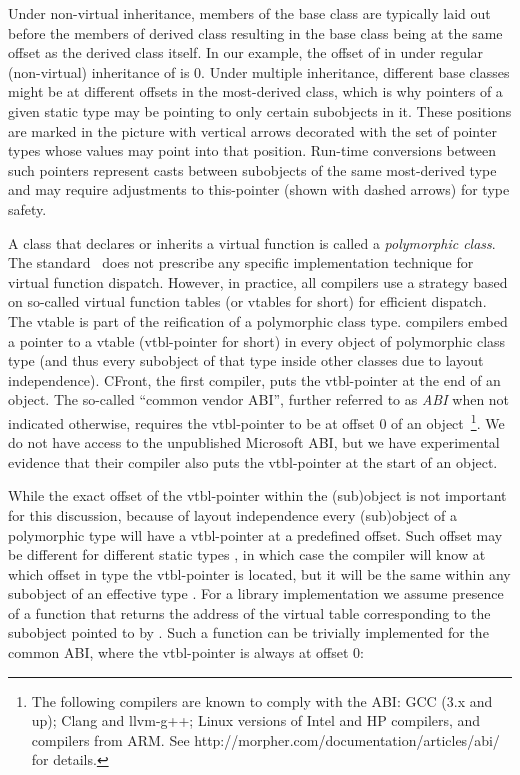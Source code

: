Under non-virtual inheritance, members of the base class are typically laid out 
before the members of derived class resulting in the base class being at the 
same offset as the derived class itself. In our example, the offset of  
in  under regular (non-virtual) inheritance of  is 0.
Under multiple inheritance, different base classes might be at different offsets 
in the most-derived class, which is why pointers of a given static type may be 
pointing to only certain subobjects in it. These positions are marked in the 
picture with vertical arrows decorated with the set of pointer types whose 
values may point into that position. Run-time conversions between such pointers 
represent casts between subobjects of the same most-derived type and may require 
adjustments to this-pointer (shown with dashed arrows) for type safety.

A class that declares or inherits a virtual function is called a 
\emph{polymorphic class}. The \Cpp{} standard~\cite{C++11} does not prescribe any 
specific implementation technique for virtual function dispatch.
However, in practice, all \Cpp{} compilers use a strategy based on so-called
virtual function tables (or vtables for short) for efficient dispatch. 
The vtable is part of the reification of a polymorphic class type.  
\Cpp{} compilers embed a pointer to a vtable (vtbl-pointer for short) in every object of
polymorphic class type (and thus every subobject of that type inside other 
classes due to layout independence). CFront, the first \Cpp{} compiler, puts the 
vtbl-pointer 
at the end of an object. The so-called ``common vendor \Cpp{} ABI''\cite{C++ABI}, 
further referred to as \emph{\Cpp{} ABI} when not indicated otherwise, requires the 
vtbl-pointer to be at offset 0 of an object~\footnote{The following compilers 
are known to comply with the \Cpp{} ABI: GCC (3.x and up); Clang and llvm-g++; 
Linux versions of Intel and HP compilers, and compilers from ARM. See 
http://morpher.com/documentation/articles/abi/ for details.}. We do not have 
access to the unpublished Microsoft ABI, but we have experimental evidence that 
their \Cpp{} compiler also puts the vtbl-pointer at the start of an object.

While the exact offset of the vtbl-pointer within the (sub)object is not important 
for this discussion, because of layout independence every (sub)object of a 
polymorphic type  will have a vtbl-pointer at a predefined offset. 
Such offset may be different for different static types , in which case 
the compiler will know at which offset in type  the vtbl-pointer is 
located, but it will be the same within any subobject of an effective type 
. For a library implementation we assume presence of a function 
that returns the address of the virtual table corresponding to the subobject 
pointed to by . Such a function can be trivially implemented for the 
common \Cpp{} ABI, where the vtbl-pointer is always at offset 0:

